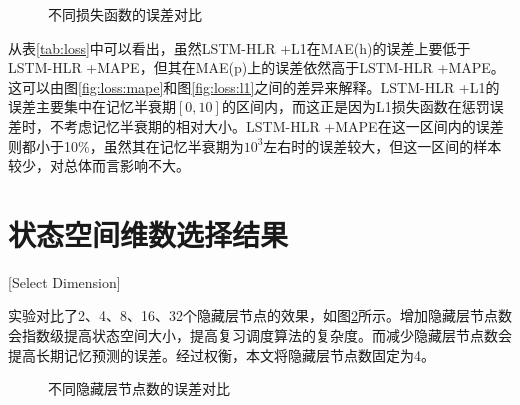 \begin{figure}[htbp]
    \centering
    \begin{minipage}{\textwidth}
    \centering
    \subfigure{\label{fig:loss:mape}}\addtocounter{subfigure}{-2}
    \hspace{2em}
    \subfigure{\label{fig:loss:l1}}\addtocounter{subfigure}{-2}
    \hspace{2em}    \end{minipage}    
    \vspace{0.2em}
    \caption{不同损失函数的误差对比}
    \label{fig:loss}
\end{figure}

从表\ref{tab:loss}中可以看出，虽然LSTM-HLR +L1在MAE(h)的误差上要低于LSTM-HLR +MAPE，但其在MAE(p)上的误差依然高于LSTM-HLR +MAPE。这可以由图\ref{fig:loss:mape}和图\ref{fig:loss:l1}之间的差异来解释。LSTM-HLR +L1的误差主要集中在记忆半衰期$[0,10]$的区间内，而这正是因为L1损失函数在惩罚误差时，不考虑记忆半衰期的相对大小。LSTM-HLR +MAPE在这一区间内的误差则都小于10\%，虽然其在记忆半衰期为$10^3$左右时的误差较大，但这一区间的样本较少，对总体而言影响不大。

\section{状态空间维数选择结果}[Select Dimension]

实验对比了2、4、8、16、32个隐藏层节点的效果，如图\ref{fig:dimension}所示。增加隐藏层节点数会指数级提高状态空间大小，提高复习调度算法的复杂度。而减少隐藏层节点数会提高长期记忆预测的误差。经过权衡，本文将隐藏层节点数固定为4。

\begin{figure}[htbp]
    \centering
    \begin{minipage}{\textwidth}
    \centering
    \subfigure{\label{fig:dimension:train}}\addtocounter{subfigure}{-2}
    \hspace{2em}
    \subfigure{\label{fig:dimension:test}}\addtocounter{subfigure}{-2}
    \end{minipage}
    \centering
    \begin{minipage}{\textwidth}
    \centering
    \subfigure{\label{fig:dimension:smooth}}\addtocounter{subfigure}{-2}
    \hspace{2em}
    \subfigure{\label{fig:dimension:trand}}\addtocounter{subfigure}{-2}
    \end{minipage}
    \vspace{0.2em}
    \caption{不同隐藏层节点数的误差对比}
    \label{fig:dimension}
\end{figure}


